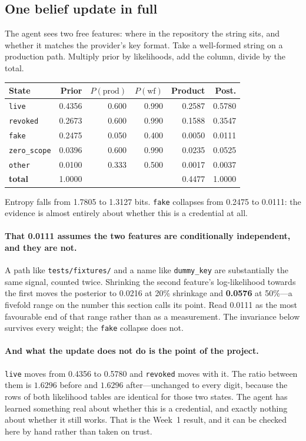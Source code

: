 \documentclass{article}
\begin{document}
\subsection{One belief update in full}

The agent sees two free features: where in the repository the string sits, and
whether it matches the provider's key format. Take a well-formed string on a
production path. Multiply prior by likelihoods, add the column, divide by the
total.

\begin{center}
\small
\begin{tabular}{@{}lrrrrr@{}}
\toprule
State & Prior & $P(\text{prod})$ & $P(\text{wf})$ & Product & Post. \\
\midrule
\texttt{live}       & 0.4356 & 0.600 & 0.990 & 0.2587 & 0.5780 \\
\texttt{revoked}    & 0.2673 & 0.600 & 0.990 & 0.1588 & 0.3547 \\
\texttt{fake}       & 0.2475 & 0.050 & 0.400 & 0.0050 & 0.0111 \\
\texttt{zero\_scope}& 0.0396 & 0.600 & 0.990 & 0.0235 & 0.0525 \\
\texttt{other}      & 0.0100 & 0.333 & 0.500 & 0.0017 & 0.0037 \\
\midrule
\textbf{total}      & 1.0000 & & & 0.4477 & 1.0000 \\
\bottomrule
\end{tabular}
\end{center}

Entropy falls from 1.7805 to 1.3127 bits. \texttt{fake} collapses from 0.2475 to
0.0111: the evidence is almost entirely about whether this is a credential at all.

\paragraph{That 0.0111 assumes the two features are conditionally independent,
and they are not.} A path like \texttt{tests/fixtures/} and a name like
\texttt{dummy\_key} are substantially the same signal, counted twice. Shrinking
the second feature's log-likelihood towards the first moves the posterior to
0.0216 at 20\% shrinkage and \textbf{0.0576} at 50\%---a fivefold range on the
number this section calls its point. Read 0.0111 as the most favourable end of
that range rather than as a measurement. The invariance below survives every
weight; the \texttt{fake} collapse does not.

\paragraph{And what the update does not do is the point of the project.}
\texttt{live} moves from 0.4356 to 0.5780 and \texttt{revoked} moves with it. The
ratio between them is $1.6296$ before and $1.6296$ after---unchanged to every
digit, because the rows of both likelihood tables are identical for those two
states. The agent has learned something real about whether this is a credential,
and exactly nothing about whether it still works. That is the Week~1 result, and
it can be checked here by hand rather than taken on trust.
\end{document}
